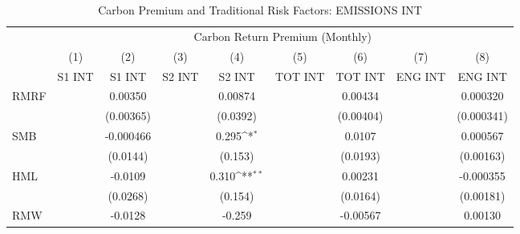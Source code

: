 \begin{table}[htbp]\centering
\def\sym#1{\ifmmode^{#1}\else\(^{#1}\)\fi}
\caption{Carbon Premium and Traditional Risk Factors: EMISSIONS INT}
\begin{tabular}{l*{8}{c}}
\hline\hline
                    &\multicolumn{8}{c}{Carbon Return Premium (Monthly)}                                                                                                                            \\\cmidrule(lr){2-9}
                    &\multicolumn{1}{c}{(1)}&\multicolumn{1}{c}{(2)}&\multicolumn{1}{c}{(3)}&\multicolumn{1}{c}{(4)}&\multicolumn{1}{c}{(5)}&\multicolumn{1}{c}{(6)}&\multicolumn{1}{c}{(7)}&\multicolumn{1}{c}{(8)}\\
                    &\multicolumn{1}{c}{S1 INT}&\multicolumn{1}{c}{S1 INT}&\multicolumn{1}{c}{S2 INT}&\multicolumn{1}{c}{S2 INT}&\multicolumn{1}{c}{TOT INT}&\multicolumn{1}{c}{TOT INT}&\multicolumn{1}{c}{ENG INT}&\multicolumn{1}{c}{ENG INT}\\
\hline
RMRF                &                     &     0.00350         &                     &     0.00874         &                     &     0.00434         &                     &    0.000320         \\
                    &                     &   (0.00365)         &                     &    (0.0392)         &                     &   (0.00404)         &                     &  (0.000341)         \\
SMB                 &                     &   -0.000466         &                     &       0.295\sym{*}  &                     &      0.0107         &                     &    0.000567         \\
                    &                     &    (0.0144)         &                     &     (0.153)         &                     &    (0.0193)         &                     &   (0.00163)         \\
HML                 &                     &     -0.0109         &                     &       0.310\sym{**} &                     &     0.00231         &                     &   -0.000355         \\
                    &                     &    (0.0268)         &                     &     (0.154)         &                     &    (0.0164)         &                     &   (0.00181)         \\
RMW                 &                     &     -0.0128         &                     &      -0.259         &                     &    -0.00567         &                     &     0.00130         \\

\end{tabular}
\end{table}
